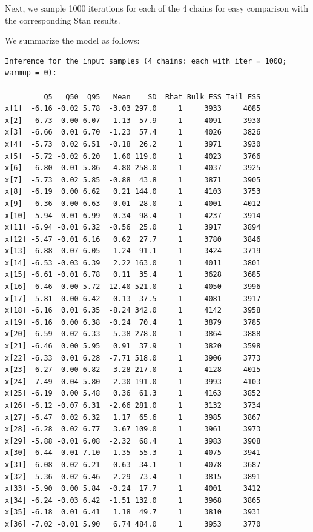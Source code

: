 \documentclass[american,]{article}
\begin{document}
Next, we sample 1000 iterations for each of the 4 chains for easy
comparison with the corresponding Stan results.

We summarize the model as follows:

\begin{verbatim}
Inference for the input samples (4 chains: each with iter = 1000; warmup = 0):

         Q5   Q50  Q95   Mean    SD  Rhat Bulk_ESS Tail_ESS
x[1]  -6.16 -0.02 5.78  -3.03 297.0     1     3933     4085
x[2]  -6.73  0.00 6.07  -1.13  57.9     1     4091     3930
x[3]  -6.66  0.01 6.70  -1.23  57.4     1     4026     3826
x[4]  -5.73  0.02 6.51  -0.18  26.2     1     3971     3930
x[5]  -5.72 -0.02 6.20   1.60 119.0     1     4023     3766
x[6]  -6.80 -0.01 5.86   4.80 258.0     1     4037     3925
x[7]  -5.73  0.02 5.85  -0.88  43.8     1     3871     3905
x[8]  -6.19  0.00 6.62   0.21 144.0     1     4103     3753
x[9]  -6.36  0.00 6.63   0.01  28.0     1     4001     4012
x[10] -5.94  0.01 6.99  -0.34  98.4     1     4237     3914
x[11] -6.94 -0.01 6.32  -0.56  25.0     1     3917     3894
x[12] -5.47 -0.01 6.16   0.62  27.7     1     3780     3846
x[13] -6.88 -0.07 6.05  -1.24  91.1     1     3424     3719
x[14] -6.53 -0.03 6.39   2.22 163.0     1     4011     3801
x[15] -6.61 -0.01 6.78   0.11  35.4     1     3628     3685
x[16] -6.46  0.00 5.72 -12.40 521.0     1     4050     3996
x[17] -5.81  0.00 6.42   0.13  37.5     1     4081     3917
x[18] -6.16  0.01 6.35  -8.24 342.0     1     4142     3958
x[19] -6.16  0.00 6.38  -0.24  70.4     1     3879     3785
x[20] -6.59  0.02 6.33   5.38 278.0     1     3864     3888
x[21] -6.46  0.00 5.95   0.91  37.9     1     3820     3598
x[22] -6.33  0.01 6.28  -7.71 518.0     1     3906     3773
x[23] -6.27  0.00 6.82  -3.28 217.0     1     4128     4015
x[24] -7.49 -0.04 5.80   2.30 191.0     1     3993     4103
x[25] -6.19  0.00 5.48   0.36  61.3     1     4163     3852
x[26] -6.12 -0.07 6.31  -2.66 281.0     1     3132     3734
x[27] -6.47  0.02 6.32   1.17  65.6     1     3985     3867
x[28] -6.28  0.02 6.77   3.67 109.0     1     3961     3973
x[29] -5.88 -0.01 6.08  -2.32  68.4     1     3983     3908
x[30] -6.44  0.01 7.10   1.35  55.3     1     4075     3941
x[31] -6.08  0.02 6.21  -0.63  34.1     1     4078     3687
x[32] -5.36 -0.02 6.46  -2.29  73.4     1     3815     3891
x[33] -5.90  0.00 5.84  -0.24  17.7     1     4001     3412
x[34] -6.24 -0.03 6.42  -1.51 132.0     1     3968     3865
x[35] -6.18  0.01 6.41   1.18  49.7     1     3810     3931
x[36] -7.02 -0.01 5.90   6.74 484.0     1     3953     3770

\end{verbatim}
\end{document}
